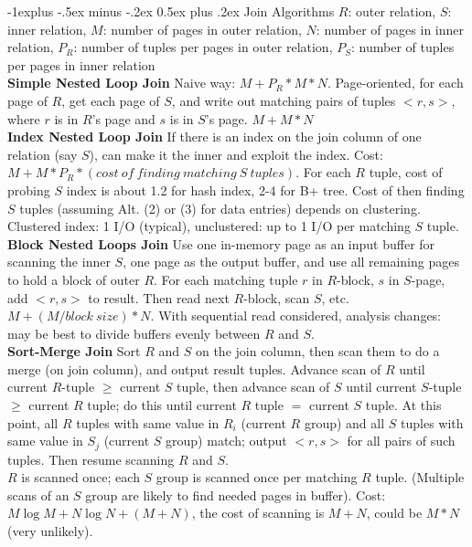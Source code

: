 \documentclass[12pt,landscape]{article}
\makeatletter
\renewcommand{\subsection}{\@startsection{subsection}{2}{0mm}%
                                {-1explus -.5ex minus -.2ex}%
                                {0.5ex plus .2ex}%
                                {\normalfont\normalsize\bfseries}}
\makeatother
\begin{document}
\begin{multicols}{3}
\subsection{Join Algorithms}
$R$: outer relation, $S$: inner relation, $M$: number of pages in outer relation, $N$: number of pages in inner relation, ${P}_{R}$: number of tuples per pages in outer relation, ${P}_{S}$: number of tuples per pages in inner relation \\
{\bf Simple Nested Loop Join} Naive way: $M + {P}_{R}*M*N$. Page-oriented, for each page of $R$, get each page of $S$, and write out matching pairs of tuples $<r, s>$, where $r$ is in $R$'s page and $s$ is in $S$'s page. $M + M*N$ \\
{\bf Index Nested Loop Join} If there is an index on the join column of one relation (say $S$), can make it the inner and exploit the index. Cost: $M + M*P_{R}*(cost\ of\ finding\ matching\ S\ tuples)$. For each $R$ tuple, cost of probing $S$ index is about 1.2 for hash index, 2-4 for B+ tree. Cost of then finding $S$ tuples (assuming Alt. (2) or (3) for data entries) depends on clustering. Clustered index: 1 I/O (typical), unclustered: up to 1 I/O per matching $S$ tuple. \\
{\bf Block Nested Loops Join} Use one in-memory page as an input buffer for scanning the inner $S$, one page as the output buffer, and use all remaining pages to hold a block of outer $R$. For each matching tuple $r$ in $R$-block, $s$ in $S$-page, add $<r, s>$ to result. Then read next $R$-block, scan $S$, etc. $M + (M/block\ size) * N$.  With sequential read considered, analysis changes: may be best to divide buffers evenly between $R$ and $S$.\\
{\bf Sort-Merge Join} Sort $R$ and $S$ on the join column, then scan them to do a merge (on join column), and output result tuples. Advance scan of $R$ until current $R$-tuple $\geq$ current $S$ tuple, then advance scan of $S$ until current $S$-tuple $\geq$ current $R$ tuple; do this until current $R$ tuple $=$ current $S$ tuple. At this point, all $R$ tuples with same value in $R_i$ (current $R$ group) and all $S$ tuples with same value in $S_j$ (current $S$ group) match; output $<r, s>$ for all pairs of such tuples. Then resume scanning $R$ and $S$. \\
$R$ is scanned once; each $S$ group is scanned once per matching $R$ tuple. (Multiple scans of an $S$ group are likely to find needed pages in buffer). Cost: $M \log{M} + N\log{N} + (M+N)$, the cost of scanning is $M+N$, could be $M*N$ (very unlikely). \\

\end{multicols}
\end{document}
